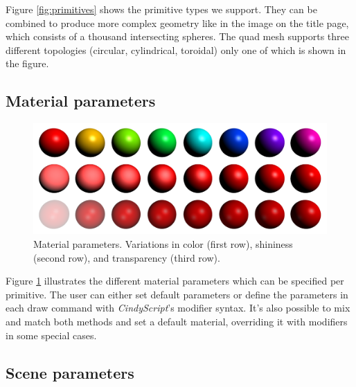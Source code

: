 \documentclass[appendixprefix,a4paper]{scrreprt}
\begin{document}
Figure \ref{fig:primitives} shows the primitive types we support. 
They can be combined to produce more complex geometry like in the image on 
the title page, which consists of a thousand intersecting spheres. The quad 
mesh supports three different topologies (circular, cylindrical, toroidal) 
only one of which is shown in the figure.

\subsection{Material parameters}

\begin{figure}
\centering
\includegraphics[width=\textwidth]{material}
\caption[Material parameters]{Material parameters. Variations in color (first 
row), shininess (second row), and transparency (third row).}
\label{fig:material}
\end{figure}

Figure \ref{fig:material} illustrates the different material parameters which 
can be specified per primitive. The user can either set default parameters or 
define the parameters in each draw command with \emph{CindyScript}'s modifier 
syntax. It's also possible to mix and match both methods and set a default 
material, overriding it with modifiers in some special cases.

\subsection{Scene parameters}
\end{document}
